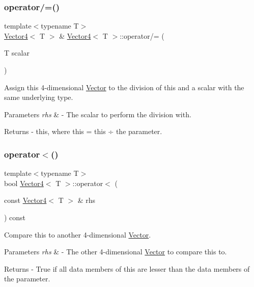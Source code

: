 \subsubsection{\texorpdfstring{operator/=()}{operator/=()}}
{\footnotesize\ttfamily template$<$typename T$>$ \\
\mbox{\hyperlink{class_vector4}{Vector4}}$<$ T $>$ \& \mbox{\hyperlink{class_vector4}{Vector4}}$<$ T $>$\+::operator/= (\begin{DoxyParamCaption}\item[{T}]{scalar }\end{DoxyParamCaption})}

Assign this 4-\/dimensional \mbox{\hyperlink{class_vector}{Vector}} to the division of this and a scalar with the same underlying type. 
\begin{DoxyParams}{Parameters}
{\em rhs} & -\/ The scalar to perform the division with. \\
\hline
\end{DoxyParams}
\begin{DoxyReturn}{Returns}
-\/ this, where \textquotesingle{}this = this ÷ the parameter\textquotesingle{}. 
\end{DoxyReturn}
\mbox{\label{class_vector4_a089d05a63badd584f1ec737f0a0cd192}} 
\subsubsection{\texorpdfstring{operator$<$()}{operator<()}}
{\footnotesize\ttfamily template$<$typename T$>$ \\
bool \mbox{\hyperlink{class_vector4}{Vector4}}$<$ T $>$\+::operator$<$ (\begin{DoxyParamCaption}\item[{const \mbox{\hyperlink{class_vector4}{Vector4}}$<$ T $>$ \&}]{rhs }\end{DoxyParamCaption}) const}

Compare this to another 4-\/dimensional \mbox{\hyperlink{class_vector}{Vector}}. 
\begin{DoxyParams}{Parameters}
{\em rhs} & -\/ The other 4-\/dimensional \mbox{\hyperlink{class_vector}{Vector}} to compare this to. \\
\hline
\end{DoxyParams}
\begin{DoxyReturn}{Returns}
-\/ True if all data members of this are lesser than the data members of the parameter. 
\end{DoxyReturn}
\mbox{\label{class_vector4_a28a0678b1053a1854a15046a369dcb8d}} 
